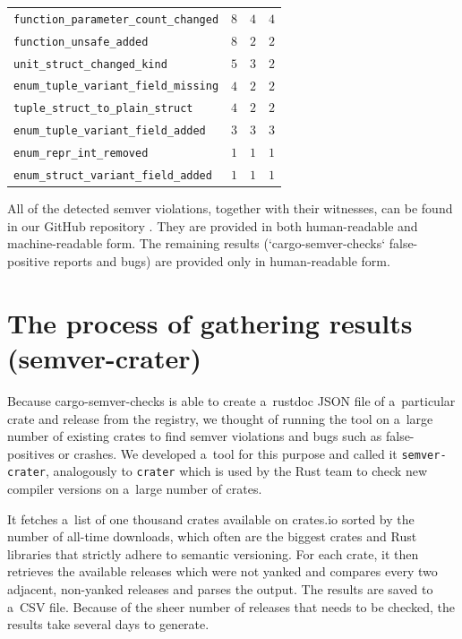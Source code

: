 \documentclass[licencjacka,en]{pracamgr}
\newcommand\Bspace{\rule[-0.9ex]{0pt}{0pt}}   %
\begin{document}
\begin{center}
\begin{longtable}{| p{7.75cm} | p{1.975cm} | p{1.975cm} | p{1.975cm} |}
			\texttt{function\_parameter\_count\_changed} & $8$ & $4$ & $4$ \\
			\texttt{function\_unsafe\_added} & $8$ & $2$ & $2$ \\
			\texttt{unit\_struct\_changed\_kind} & $5$ & $3$ & $2$ \\
			\texttt{enum\_tuple\_variant\_field\_missing} & $4$ & $2$ & $2$ \\
			\texttt{tuple\_struct\_to\_plain\_struct} & $4$ & $2$ & $2$ \\
			\texttt{enum\_tuple\_variant\_field\_added} & $3$ & $3$ & $3$ \\
			\texttt{enum\_repr\_int\_removed} & $1$ & $1$ & $1$ \\
			\texttt{enum\_struct\_variant\_field\_added} & $1$ & $1$ & $1$ \Bspace \\
		\hline
	\end{longtable}
\end{center}

All of the detected semver violations, together with their witnesses, can be found in our GitHub repository \cite{github-csv-results}.
They are provided in both human-readable and machine-readable form.
The remaining results (`cargo-semver-checks` false-positive reports and bugs) are provided only in human-readable form.

\section{The process of gathering results (semver-crater)}\label{r:section_results_semver_crater}

Because cargo-semver-checks is able to create a~rustdoc JSON file
of a~particular crate and release from the registry,
we thought of running the tool on a~large number of existing crates
to find semver violations and bugs such as false-positives or crashes.
We developed a~tool for this purpose and called it \texttt{semver-crater},
analogously to \texttt{crater} which is used by the Rust team to check
new compiler versions on a~large number of crates.

It fetches a~list of one thousand crates available on crates.io sorted by the number of
all-time downloads, which often are the biggest crates and Rust libraries
that strictly adhere to semantic versioning. For each crate,
it then retrieves the available releases which were not yanked
and compares every two adjacent, non-yanked releases and parses the output.
The results are saved to a~CSV file.
Because of the sheer number of releases that needs to be checked, the results take several days to generate.
\end{document}
